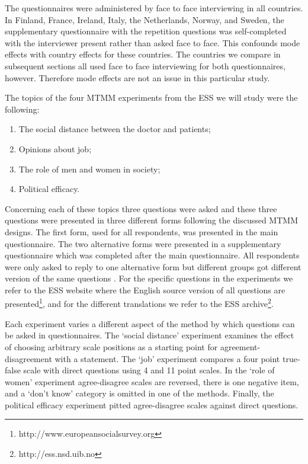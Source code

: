 \documentclass[a4paper,12pt]{article}
\begin{document}
The questionnaires were administered by face to face interviewing in all countries. In Finland, France, Ireland, Italy, the Netherlands, Norway, and Sweden, the supplementary questionnaire with the repetition questions was self-completed with the interviewer present rather than asked face to face. This confounds mode effects with country effects for these countries. The countries we compare in subsequent sections all used face to face interviewing for both questionnaires, however. Therefore mode effects are not an issue in this particular study.

The topics of the four MTMM experiments from the ESS we will study were the following:
\begin{enumerate}
\item The social distance between the doctor and patients;
\item Opinions about job;
\item The role of men and women in society;
\item Political efficacy.
\end{enumerate}
Concerning each of these topics three questions were asked and these three questions were presented in three different forms following the discussed MTMM designs. The first form,  used for all respondents, was presented in the main questionnaire. The two alternative forms were presented in a supplementary questionnaire which was completed after the main questionnaire. All respondents were only asked to reply to one alternative form but different groups got different version of the same questions \citep*{saris_new_2004}. For the specific questions in the experiments we refer to the ESS website where the English source version of all questions are presented\footnote{http://www.europeansocialsurvey.org}, and for the different translations we refer to the ESS archive\footnote{http://ess.nsd.uib.no}.

	Each experiment varies a different aspect of the method by which questions can be asked in questionnaires. The `social distance' experiment examines the effect of choosing arbitrary scale positions as a starting point for agreement-disagreement with a statement. The `job' experiment compares a four point true-false scale with direct questions using 4 and 11 point scales. In the `role of women' experiment agree-disagree scales are reversed, there is one negative item, and a `don't know' category is omitted in one of the methods.  Finally, the political efficacy experiment pitted agree-disagree scales against direct questions.
\end{document}
